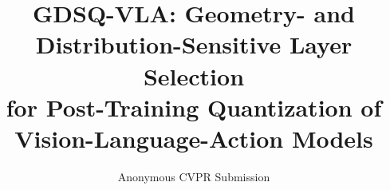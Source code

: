 \documentclass[10pt,twocolumn,letterpaper]{article}
\title{GDSQ-VLA: Geometry- and Distribution-Sensitive Layer Selection\\
for Post-Training Quantization of Vision-Language-Action Models}
\author{Anonymous CVPR Submission}
\begin{document}
\maketitle








{
    \small
    
    
}
\end{document}
